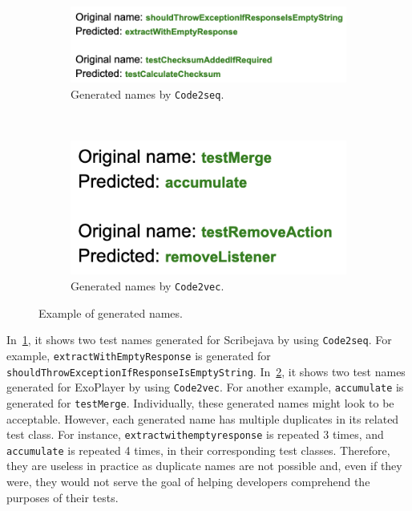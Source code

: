 \begin{appendices}
\begin{figure}[t]
\centering
\begin{subfigure}[b]{1.0\textwidth}
\centering
\includegraphics[scale=0.5]{figures/dup1.png}
\caption{Generated names by \texttt{Code2seq}.}
\label{fig:generated1}
\end{subfigure}\\
\vspace{0.2cm}
\begin{subfigure}[b]{0.5\textwidth}
\centering
\includegraphics[scale=0.5]{figures/dup2.png}
\caption{Generated names by \texttt{Code2vec}.}
\label{fig:generated2}
\end{subfigure}
\caption{Example of generated names.}
\label{fig:duplicate-names}
\end{figure}


In~\cref{fig:generated1}, it shows two test names generated for Scribejava by using \texttt{Code2seq}.
%
For example, \texttt{extract\-With\-Empty\-Response} is generated for \texttt{should\-Throw\-Exception\-If\-Response\-Is\-Empty\-String}.
%
In~\cref{fig:generated2}, it shows two test names generated for ExoPlayer by using \texttt{Code2vec}.
%
For another example, \texttt{accumulate} is generated for \texttt{test\-Merge}.
%
Individually, these generated names might look to be acceptable.
%
However, each generated name has multiple duplicates in its related test class.
%
For instance, \texttt{extract\-with\-empty\-response} is repeated \num{3} times, and \texttt{accumulate} is repeated \num{4} times, in their corresponding test classes.
%
Therefore, they are useless in practice as duplicate names are not possible and, even if they were, they would not serve the goal of helping developers comprehend the purposes of their tests.




\end{appendices}
